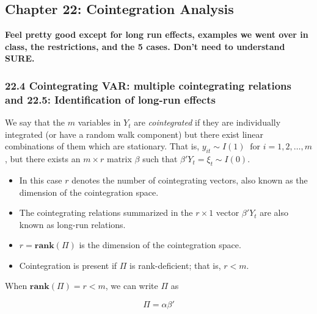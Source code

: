 %
%
%
%
%
%

\subsection{Chapter 22: Cointegration Analysis}

\textbf{Feel pretty good except for long run effects, examples we went over in class, the restrictions, and the 5 cases. Don't need to understand SURE.}

\subsubsection{22.4 Cointegrating VAR: multiple cointegrating relations and 22.5: Identification of long-run effects}\label{ts.pesaran.22.4}
\begin{definition}\label{ts.ch22.def.cointegrated} We say that the \(m\) variables in \(Y_t\) are \textit{cointegrated} if they are individually integrated (or have a random walk component) but there exist linear combinations of them which are stationary. That is, \(y_{it} \sim I(1) \ \text{ for } i = 1, 2, \ldots, m\), but there exists an \(m \times r\) matrix \(\beta\) such that \(\beta'Y_t = \xi_t \sim I(0)\). 
\end{definition}

\begin{itemize}

\item In this case \(r\) denotes the number of cointegrating vectors, also known as the dimension of the cointegration space. 

\item The cointegrating relations summarized in the \(r \times 1\) vector \(\beta'Y_t \) are also known as long-run relations.

\item \(r = \textbf{rank}(\Pi)\) is the dimension of the cointegration space. 

\item Cointegration is present if \(\Pi\) is rank-deficient; that is, \(r < m\).

\end{itemize}

When \(\textbf{rank}(\Pi) = r < m\), we can write \(\Pi\) as 

\begin{equation}\label{ts.eq.22.18}
\Pi = \alpha \beta'
\end{equation}

